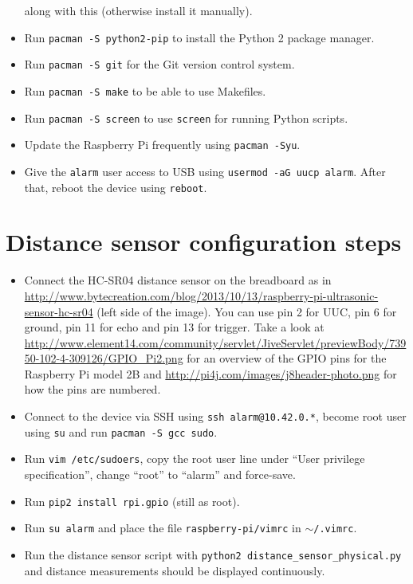 \documentclass{article}
\begin{document}
\begin{itemize}
          along with this (otherwise install it manually).
    \item Run {\tt pacman -S python2-pip} to install the Python 2 package 
          manager.
    \item Run {\tt pacman -S git} for the Git version control system.
    \item Run {\tt pacman -S make} to be able to use Makefiles.
    \item Run {\tt pacman -S screen} to use {\tt screen} for running Python
          scripts.
    \item Update the Raspberry Pi frequently using {\tt pacman -Syu}.
    \item Give the {\tt alarm} user access to USB using
          {\tt usermod -aG uucp alarm}. After that, reboot the device using
          {\tt reboot}.
\end{itemize}

\section{Distance sensor configuration steps}
\begin{itemize}
    \item Connect the HC-SR04 distance sensor on the breadboard as in
          \url{http://www.bytecreation.com/blog/2013/10/13/raspberry-pi-ultrasonic-sensor-hc-sr04}
          (left side of the image). You can use pin 2 for UUC, pin 6 for
          ground, pin 11 for echo and pin 13 for trigger. Take a look at
          \url{http://www.element14.com/community/servlet/JiveServlet/previewBody/73950-102-4-309126/GPIO_Pi2.png}
          for an overview of the GPIO pins for the Raspberry Pi model 2B and
          \url{http://pi4j.com/images/j8header-photo.png} for how the pins are
          numbered.
    \item Connect to the device via SSH using {\tt ssh alarm@10.42.0.*}, become
          root user using {\tt su} and run {\tt pacman -S gcc sudo}.
    \item Run {\tt vim /etc/sudoers}, copy the root user line under ``User
          privilege specification'', change ``root'' to ``alarm'' and
          force-save.
    \item Run {\tt pip2 install rpi.gpio} (still as root).
    \item Run {\tt su alarm} and place the file {\tt raspberry-pi/vimrc} in
          {\tt $\sim$/.vimrc}.
    \item Run the distance sensor script with {\tt python2 distance\_sensor\_physical.py}
          and distance measurements should be displayed continuously.
\end{itemize}
\end{document}
